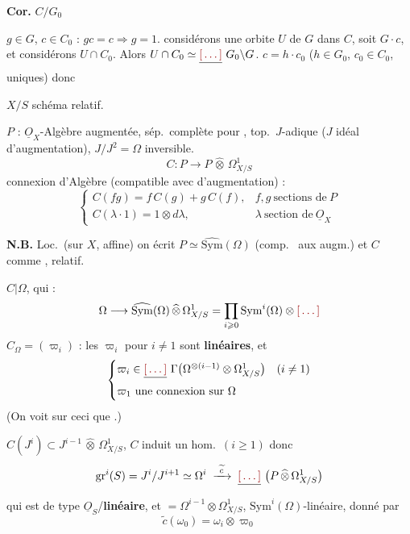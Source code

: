 \documentclass[11pt,a4paper]{article}
\begin{document}
\textbf{Cor.} $C/G_0$ \ill{}

 $g \in G$, $c \in C_0$ : $gc = c \Rightarrow g = 1$.
 considérons une orbite $U$ de $G$ dans
$C$, soit $G\cdot c$, et considérons $U \cap C_0$. Alors
$U \cap C_0 \simeq \struck{\ill{}}\ G_0 \backslash G$. \struck{\ill{}}
$c = h\cdot c_0$ ($h \in G_0$, $c_0 \in C_0$, uniques) donc \ill{}

$X/S$ schéma relatif.

$P$ : $\underline{O}_X$-Algèbre augmentée, sép.\ complète pour ,
top.\ $J$-adique ($J$ idéal d'augmentation), $J/J^2 = \Omega$ inversible.
\[
  C : P \longrightarrow P \,\widehat{\otimes}\, \Omega^1_{X/S}
\]
connexion d'Algèbre \ill{}  (compatible avec \ill{}
d'augmentation) :
\[
  \begin{cases}
    C(fg) = f\,C(g) + g\,C(f), & f, g \ \text{sections de}\ P \\
    C(\lambda \cdot 1) = 1 \otimes d\lambda, & \lambda \ \text{section de}\ \underline{O}_X
  \end{cases}
\]

\struck{\ill{}} \textbf{N.B.} Loc.\ (sur $X$, \ill{} affine) on écrit
  $P \simeq \widehat{\mathrm{Sym}}(\Omega)$
(comp.\ \ill{} aux \ill{} augm.) et $C$ comme \ill{}, \ill{} relatif.

$C|\Omega$, qui \ill{} :
\[
  \Omega \longrightarrow \widehat{\mathrm{Sym}}(\Omega) \,\widehat{\otimes}\, \Omega^1_{X/S}
  = \prod_{i \geqslant 0} \mathrm{Sym}^i(\Omega) \otimes \ill{}
\]
$C_\Omega = (\varpi_i)$ : les $\varpi_i$ pour $i \neq 1$ sont
\textbf{linéaires}, et
\[
  \begin{cases}
    \varpi_i \in \struck{\ill{}}\ \Gamma\bigl(\Omega^{\otimes (i-1)} \otimes \Omega^1_{X/S}\bigr) & (i \neq 1) \\
    \varpi_1 \ \text{une connexion sur}\ \Omega
  \end{cases}
\]
(On voit sur ceci que \ill{}.)

$C(J^i) \subset J^{i-1} \,\widehat{\otimes}\, \Omega^1_{X/S}$, $C$ induit un hom.\
$(i \geqslant 1)$ donc
\[
  \mathrm{gr}^i(S) = J^i/J^{i+1} \simeq \Omega^i
  \;\xrightarrow{\ \widetilde{c}\ }\;
  \struck{\ill{}}\ \bigl(P \,\widehat{\otimes}\, \Omega^1_{X/S}\bigr)
\]
qui est de type $\underline{O}_S$/\textbf{linéaire}, et
$= \Omega^{i-1} \otimes \Omega^1_{X/S}$, $\mathrm{Sym}^i(\Omega)$-linéaire, donné
par
\[
  \widetilde{c}(\omega_0) = \omega_i \otimes \varpi_0
\]
\end{document}

